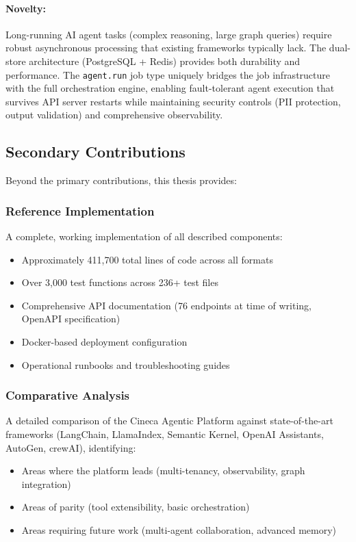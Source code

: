 \documentclass[a4paper,twoside]{sapthesis}
\begin{document}
\paragraph{Novelty:} Long-running AI agent tasks (complex reasoning, large graph queries) require robust asynchronous processing that existing frameworks typically lack. The dual-store architecture (PostgreSQL + Redis) provides both durability and performance. The \texttt{agent.run} job type uniquely bridges the job infrastructure with the full orchestration engine, enabling fault-tolerant agent execution that survives API server restarts while maintaining security controls (PII protection, output validation) and comprehensive observability.

\subsection{Secondary Contributions}

Beyond the primary contributions, this thesis provides:

\subsubsection{Reference Implementation}

A complete, working implementation of all described components:
\begin{itemize}
    \item Approximately 411,700 total lines of code across all formats
    \item Over 3,000 test functions across 236+ test files
    \item Comprehensive API documentation (76 endpoints at time of writing, OpenAPI specification)
    \item Docker-based deployment configuration
    \item Operational runbooks and troubleshooting guides
\end{itemize}

\subsubsection{Comparative Analysis}

A detailed comparison of the Cineca Agentic Platform against state-of-the-art frameworks (LangChain, LlamaIndex, Semantic Kernel, OpenAI Assistants, AutoGen, crewAI), identifying:
\begin{itemize}
    \item Areas where the platform leads (multi-tenancy, observability, graph integration)
    \item Areas of parity (tool extensibility, basic orchestration)
    \item Areas requiring future work (multi-agent collaboration, advanced memory)
\end{itemize}
\end{document}
